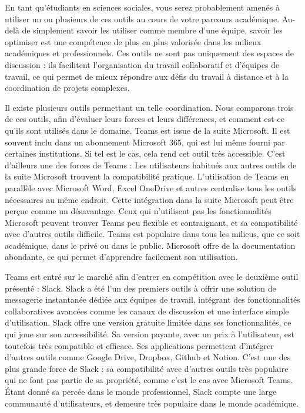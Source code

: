 \documentclass[
  letterpaper,
  DIV=11,
  numbers=noendperiod]{scrreprt}
\begin{document}
En tant qu'étudiants en sciences sociales, vous serez probablement
amenés à utiliser un ou plusieurs de ces outils au cours de votre
parcours académique. Au-delà de simplement savoir les utiliser comme
membre d'une équipe, savoir les optimiser est une compétence de plus en
plus valorisée dans les milieux académiques et professionnels. Ces
outils ne sont pas uniquement des espaces de discussion : ils facilitent
l'organisation du travail collaboratif et d'équipes de travail, ce qui
permet de mieux répondre aux défis du travail à distance et à la
coordination de projets complexes.

Il existe plusieurs outils permettant un telle coordination. Nous
comparons trois de ces outils, afin d'évaluer leurs forces et leurs
différences, et comment est-ce qu'ils sont utilisés dans le domaine.
Teams est issue de la suite Microsoft. Il est souvent inclu dans un
abonnement Microsoft 365, qui est lui même fourni par certaines
institutions. Si tel est le cas, cela rend cet outil très accessible.
C'est d'ailleurs une des forces de Teams : Les utilisateurs habitués aux
autres outils de la suite Microsoft trouvent la compatibilité pratique.
L'utilisation de Teams en parallèle avec Microsoft Word, Excel OneDrive
et autres centralise tous les outils nécessaires au même endroit. Cette
intégration dans la suite Microsoft peut être perçue comme un
désavantage. Ceux qui n'utilisent pas les fonctionnalités Microsoft
peuvent trouver Teams peu flexible et contraignant, et sa compatibilité
avec d'autres outils difficile. Teams est populaire dans tous les
milieus, que ce soit académique, dans le privé ou dans le public.
Microsoft offre de la documentation abondante, ce qui permet d'apprendre
facilement son utilisation.

Teams est entré sur le marché afin d'entrer en compétition avec le
deuxième outil présenté : Slack. Slack a été l'un des premiers outils à
offrir une solution de messagerie instantanée dédiée aux équipes de
travail, intégrant des fonctionnalités collaboratives avancées comme les
canaux de discussion et une interface simple d'utilisation. Slack offre
une version gratuite limitée dans ses fonctionnalités, ce qui joue sur
son accessibilité. Sa version payante, avec un prix à l'utilisateur, est
toutefois très compatible et efficace. Ses applications permettent
d'intégrer d'autres outils comme Google Drive, Dropbox, Github et
Notion. C'est une des plus grande force de Slack : sa compatibilité avec
d'autres outils très populaire qui ne font pas partie de sa propriété,
comme c'est le cas avec Microsoft Teams. Étant donné sa percée dans le
monde professionnel, Slack compte une large communauté d'utilisateurs,
et demeure très populaire dans le monde académique.
\end{document}
